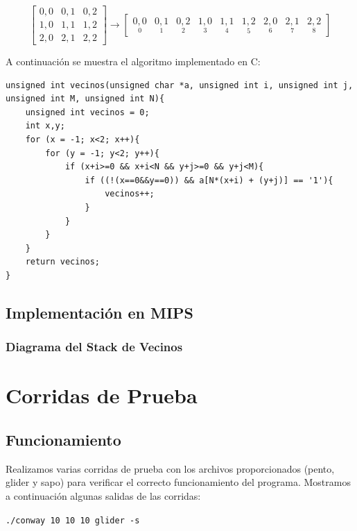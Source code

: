 \documentclass[11pt,a4paper]{article}
\begin{document}
\begin{equation*}
\begin{bmatrix}
0,0 & 0,1 & 0,2 \\
1,0 & 1,1 & 1,2 \\
2,0 & 2,1 & 2,2
\end{bmatrix}
\rightarrow 
\begin{bmatrix}
\underset{0}{0,0} & \underset{1}{0,1} & \underset{2}{0,2} & \underset{3}{1,0} & \underset{4}{1,1} & \underset{5}{1,2} & \underset{6}{2,0} & \underset{7}{2,1} & \underset{8}{2,2}
\end{bmatrix}
\end{equation*}

A continuación se muestra el algoritmo implementado en C:

\begin{lstlisting}[caption={Código de la funcion vecinos},label={lst:codigoc}]
unsigned int vecinos(unsigned char *a, unsigned int i, unsigned int j, unsigned int M, unsigned int N){
	unsigned int vecinos = 0;
	int x,y;
	for (x = -1; x<2; x++){
		for (y = -1; y<2; y++){
			if (x+i>=0 && x+i<N && y+j>=0 && y+j<M){
				if ((!(x==0&&y==0)) && a[N*(x+i) + (y+j)] == '1'){
					vecinos++;
				}
			}
		}
	}
	return vecinos;
}
\end{lstlisting}

\subsection{Implementación en MIPS}

\subsubsection{Diagrama del Stack de Vecinos}

\section{Corridas de Prueba}

\subsection{Funcionamiento}
Realizamos varias corridas de prueba con los archivos proporcionados (pento, glider y sapo) para verificar el correcto funcionamiento del programa. Mostramos a continuación algunas salidas de las corridas:

\texttt{./conway 10 10 10 glider -s}
\end{document}
